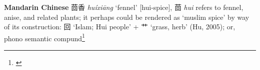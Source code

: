 \begin{etymology}\label{ety:huixiang}
\textbf{Mandarin Chinese} {茴香} \textit{huíxiāng} `fennel' [hui-spice], 茴 \textit{hui} refers to fennel, anise, and related plants; it perhaps could be rendered as `muslim spice' by way of its construction: 回 `Islam; Hui people' +  艹 `grass, herb' (Hu, 2005); or, phono semantic compund\footnote{\textcite{hu_food_2005}}
\end{etymology}
